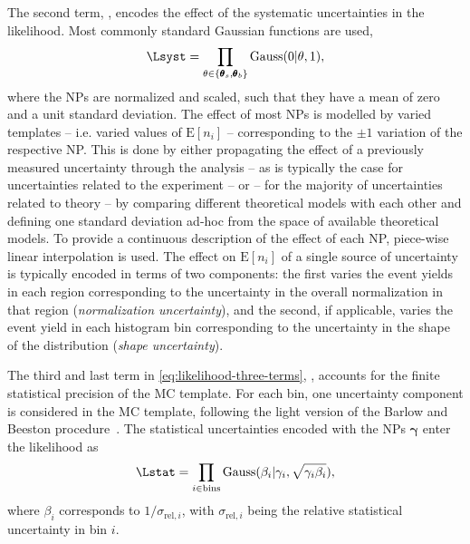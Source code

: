 The second term, \Lsyst, encodes the effect of the systematic uncertainties in the likelihood. Most commonly standard Gaussian functions are used,
\begin{equation}
    \Lsyst = \prod_{\theta \in \{ \pmb{\theta}_s,\pmb{\theta}_b \}} \text{Gauss}(0 | \theta, 1),
\end{equation}
where the NPs are normalized and scaled, such that they have a mean of zero and a unit standard deviation.
The effect of most NPs is modelled by varied templates -- i.e. varied values of $\text{E}[n_i]$ -- corresponding to the $\pm 1$ variation of the respective NP. This is done by either propagating the effect of a previously measured uncertainty through the analysis -- as is typically the case for uncertainties related to the experiment -- or -- for the majority of uncertainties related to theory -- by comparing different theoretical models with each other and defining one standard deviation ad-hoc from the space of available theoretical models.
To provide a continuous description of the effect of each NP, piece-wise linear interpolation is used.
The effect on $\text{E}[n_i]$ of a single source of uncertainty is typically encoded in terms of two components: the first varies the event yields in each region corresponding to the uncertainty in the overall normalization in that region (\emph{normalization uncertainty}), and the second, if applicable, varies the event yield in each histogram bin corresponding to the uncertainty in the shape of the distribution (\emph{shape uncertainty}).

The third and last term in \cref{eq:likelihood-three-terms}, \Lstat, accounts for the finite statistical precision of the MC template. For each bin, one uncertainty component is considered in the MC template, following the light version of the Barlow and Beeston procedure~\cite{BARLOW1993219}. 
The statistical uncertainties encoded with the NPs $\pmb{\gamma}$ enter the likelihood as
\begin{equation}
    \Lstat = \prod_{i \in \text{bins}} \text{Gauss}(\beta_i | \gamma_i, \sqrt{\gamma_i \beta_i}),    
\end{equation}
where $\beta_i$ corresponds to $1 / \sigma_{\text{rel}, i}$, with $\sigma_{\text{rel}, i}$ being the relative statistical uncertainty in bin $i$. 


